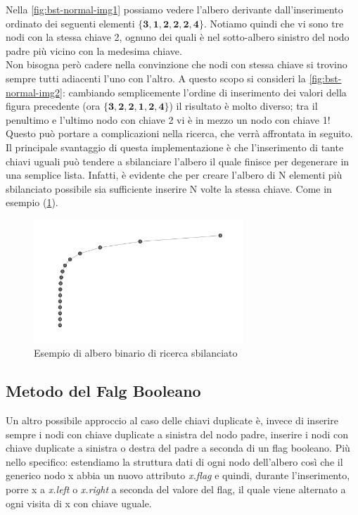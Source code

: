 \documentclass{article}
\begin{document}
Nella \cref{fig:bst-normal-img1} possiamo vedere l'albero derivante dall'inserimento ordinato dei seguenti elementi \(\mathbf{\{3, 1, 2, 2, 2, 4\}}\). Notiamo quindi che vi sono tre nodi con la stessa chiave 2, ognuno dei quali è nel sotto-albero sinistro del nodo padre più vicino con la medesima chiave.
\\
Non bisogna però cadere nella convinzione che nodi con stessa chiave si trovino sempre tutti adiacenti l'uno con l'altro.
A questo scopo si consideri la \cref{fig:bst-normal-img2}:  cambiando semplicemente l'ordine di inserimento dei valori della figura precedente (ora \(\mathbf{\{3, 2, 2, 1, 2, 4\}}\)) il risultato è molto diverso; tra il penultimo e l'ultimo nodo con chiave 2 vi è in mezzo un nodo con chiave 1!
Questo può portare a complicazioni nella ricerca, che verrà affrontata in seguito. \\

Il principale svantaggio di questa implementazione è che l'inserimento di tante chiavi uguali può tendere a sbilanciare l'albero il quale finisce per degenerare in una semplice lista. Infatti, è evidente che per creare l'albero di N elementi più sbilanciato possibile sia sufficiente inserire N volte la stessa chiave. Come in esempio (\cref{fig:bst-normal-img3}).


\begin{figure}[H]
  \centering
  \includegraphics[width=0.7\textwidth]{./images/bst-normal-img3}
  \caption{Esempio di albero binario di ricerca sbilanciato}
  \label{fig:bst-normal-img3}
\end{figure}



\subsection{Metodo del Falg Booleano}
\label{subsec:fag-implementation}

Un altro possibile approccio al caso delle chiavi duplicate è, invece di inserire sempre i nodi con chiave duplicate a sinistra del nodo padre, inserire i nodi con chiave duplicate a sinistra o destra del padre a seconda di un flag booleano. Più nello specifico: estendiamo la struttura dati di ogni nodo dell'albero così che il generico nodo x abbia un nuovo attributo \textit{x.flag} e quindi, durante l'inserimento, porre x a \textit{x.left} o \textit{x.right} a seconda del valore del flag, il quale viene alternato a ogni visita di x con chiave uguale. 
\end{document}
